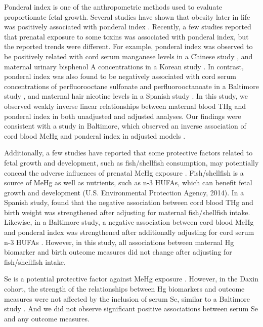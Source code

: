 Ponderal index is one of the anthropometric methods used to evaluate proportionate fetal growth. Several studies have shown that obesity later in life was positively associated with ponderal index \citep{eriksson2001size,loaiza2011birth,lausten2013neonatal}. Recently, a few studies reported that prenatal exposure to some toxins was associated with ponderal index, but the reported trends were different. For example, ponderal index was observed to be positively related with cord serum manganese levels in a Chinese study \citep{yu2013elevated}, and maternal urinary bisphenol A concentrations in a Korean study \citep{lee2014prenatal}. In contrast, ponderal index was also found to be negatively associated with cord serum concentrations of perfluorooctane sulfonate and perfluorooctanoate in a Baltimore study \citep{apelberg2007cord}, and maternal hair nicotine levels in a Spanish study \citep{pichini2003assessment}. In this study, we observed weakly inverse linear relationships between maternal blood THg and ponderal index in both unadjusted and adjusted analyses. Our findings were consistent with a study in Baltimore, which observed an inverse association of cord blood MeHg and ponderal index in adjusted models \citep{wells2016cord}.

Additionally, a few studies have reported that some protective factors related to fetal growth and development, such as fish/shellfish consumption, may potentially conceal the adverse influences of prenatal MeHg exposure \citep{ramon2010fish,wells2016cord}. Fish/shellfish is a source of MeHg as well as nutrients, such as n-3 HUFAs, which can benefit fetal growth and development (U.S. Environmental Protection Agency, 2014). In a Spanish study, \cite{ramon2010fish} found that the negative association between cord blood THg and birth weight was strengthened after adjusting for maternal fish/shellfish intake. Likewise, in a Baltimore study, a negative association between cord blood MeHg and ponderal index was strengthened after additionally adjusting for cord serum n-3 HUFAs \citep{wells2016cord}. However, in this study, all associations between maternal Hg biomarker and birth outcome measures did not change after adjusting for fish/shellfish intake.

Se is a potential protective factor against MeHg exposure \citep{choi2008selenium,wells2016cord}. However, in the Daxin cohort, the strength of the relationships between Hg biomarkers and outcome measures were not affected by the inclusion of serum Se, similar to a Baltimore study \citep{wells2016cord}. And we did not observe significant positive associations between serum Se and any outcome measures.

